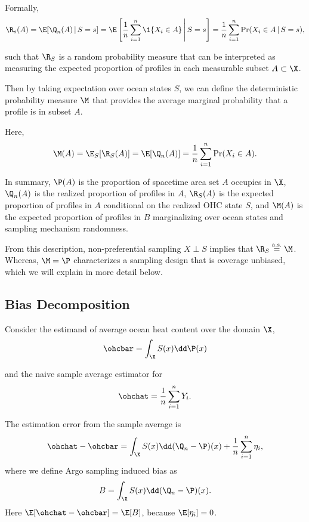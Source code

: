 Formally,
\begin{equation}
  \label{eq:Rdef}
  \R_s(A) = \E[\Q_n(A)\,|\,S = s] = \E\left[\frac{1}{n}\sum_{i=1}^n\1\{X_i \in A\}\,\middle|\,S= s\right] = \frac1n\sum_{i=1}^n\Pr(X_i \in A\,|\,S = s) ,
\end{equation}

such that $\R_S$ is a random probability measure that can be interpreted as measuring the expected proportion of profiles in each measurable subset $A \subset \X$.

Then by taking expectation over ocean states $S$, we can define the deterministic probability measure $\M$ that provides the average marginal probability that a profile is in subset $A$.

Here,
\begin{equation}
  \label{eq:Mdef}
  \M(A) = \E_{S}[\R_S(A)] = \E[\Q_n(A)] = \frac1n \sum_{i=1}^{n}\Pr(X_i \in A).
\end{equation}

In summary, $\P(A)$ is the proportion of spacetime area set $A$ occupies in $\X$, $\Q_n(A)$ is the realized proportion of profiles in $A$, $\R_S(A)$ is the expected proportion of profiles in $A$ conditional on the realized OHC state $S$, and $\M(A)$ is the expected proportion of profiles in $B$ marginalizing over ocean states and sampling mechanism randomness.

From this description, non-preferential sampling $X \perp S$ implies that $\R_S \overset{\text{a.s.}}{=} \M$.
Whereas, $\M = \P$ characterizes a sampling design that is coverage unbiased, which we will explain in more detail below.

\subsection{Bias Decomposition}
\label{sec:biasdecomp}

Consider the estimand of average ocean heat content over the domain $\X$,
\begin{equation}
  \ohcbar = \int_{\X} S(x) \dd \P(x)
\end{equation}

and the naive sample average estimator for \begin{equation}
  \ohchat = \frac1n \sum_{i=1}^{n} Y_i.
\end{equation}

The estimation error from the sample average is
\begin{equation}
  \ohchat - \ohcbar = \int_{\X} S(x) \dd (\Q_n - \P)(x) + \frac1n\sum_{i=1}^n \eta_i,
\end{equation}
where we define Argo sampling induced bias as 
\begin{equation}
  B = \int_{\X} S(x) \dd (\Q_n - \P)(x).
\end{equation}
Here $\E[\ohchat - \ohcbar] = \E[B]$, because $\E[\eta_i] = 0$.

